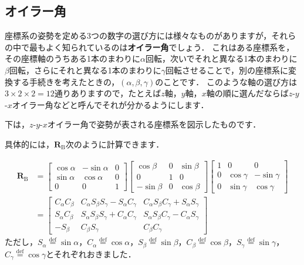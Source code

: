 ﻿\documentclass[a4paper]{jsarticle}
\begin{document}
\subsection{オイラー角}

座標系の姿勢を定める3つの数字の選び方には様々なものがありますが，それらの中で最もよく知られているのは{\bf オイラー角}でしょう．
これはある座標系を，その座標軸のうちある1本のまわりに$\alpha$回転，次いでそれと異なる1本のまわりに$\beta$回転，さらにそれと異なる1本のまわりに$\gamma$回転させることで，別の座標系に変換する手続きを考えたときの，$(\alpha, \beta, \gamma)$のことです．
このような軸の選び方は$3\times 2\times 2=12$通りありますので，たとえば$z$軸，$y$軸，$x$軸の順に選んだならば$z$-$y$-$x$オイラー角などと呼んでそれが分かるようにします．

下は，$z$-$y$-$x$オイラー角で姿勢が表される座標系を図示したものです．

\begin{figure*}[h]
\begin{center}

\end{center}
\end{figure*}

具体的には，$\boldsymbol{R}_{\mathrm{B}}$次のように計算できます．

\begin{align*}
\boldsymbol{R}_{\mathrm{B}}&=
\begin{bmatrix}
 \cos\alpha & -\sin\alpha & 0 \\
 \sin\alpha & \cos\alpha & 0 \\
 0 & 0 & 1
\end{bmatrix}
\begin{bmatrix}
 \cos\beta & 0 & \sin\beta \\
 0 & 1 & 0 \\
-\sin\beta & 0 & \cos\beta
\end{bmatrix}
\begin{bmatrix}
 1 & 0 & 0 \\
 0 & \cos\gamma & -\sin\gamma \\
 0 & \sin\gamma & \cos\gamma
\end{bmatrix} \\
&=\begin{bmatrix}
 C_{\alpha}C_{\beta} & C_{\alpha}S_{\beta}S_{\gamma}-S_{\alpha}C_{\gamma} & C_{\alpha}S_{\beta}C_{\gamma}+S_{\alpha}S_{\gamma} \\
 S_{\alpha}C_{\beta} & S_{\alpha}S_{\beta}S_{\gamma}+C_{\alpha}C_{\gamma} & S_{\alpha}S_{\beta}C_{\gamma}-C_{\alpha}S_{\gamma} \\
-S_{\beta} & C_{\beta}S_{\gamma} & C_{\beta}C_{\gamma}
\end{bmatrix}
\end{align*}
ただし，$S_{\alpha}\overset{\mathrm{def}}{=}\sin\alpha$，$C_{\alpha}\overset{\mathrm{def}}{=}\cos\alpha$，$S_{\beta}\overset{\mathrm{def}}{=}\sin\beta$，$C_{\beta}\overset{\mathrm{def}}{=}\cos\beta$，$S_{\gamma}\overset{\mathrm{def}}{=}\sin\gamma$，$C_{\gamma}\overset{\mathrm{def}}{=}\cos\gamma$とそれぞれおきました．
\end{document}
